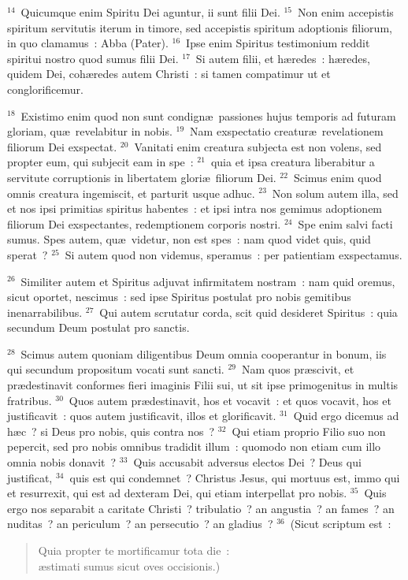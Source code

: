 ${}^{14}$~Quicumque enim Spiritu Dei aguntur, ii sunt filii Dei.
${}^{15}$~Non enim accepistis spiritum servitutis iterum in timore, sed accepistis spiritum adoptionis filiorum, in quo clamamus~: Abba (Pater).
${}^{16}$~Ipse enim Spiritus testimonium reddit spiritui nostro quod sumus filii Dei.
${}^{17}$~Si autem filii, et h\ae redes~: h\ae redes, quidem Dei, coh\ae redes autem Christi~: si tamen compatimur ut et conglorificemur.


${}^{18}$~Existimo enim quod non sunt condign\ae\ passiones hujus temporis ad futuram gloriam, qu\ae\ revelabitur in nobis.
${}^{19}$~Nam exspectatio creatur\ae\ revelationem filiorum Dei exspectat.
${}^{20}$~Vanitati enim creatura subjecta est non volens, sed propter eum, qui subjecit eam in spe~:
${}^{21}$~quia et ipsa creatura liberabitur a servitute corruptionis in libertatem glori\ae\ filiorum Dei.
${}^{22}$~Scimus enim quod omnis creatura ingemiscit, et parturit usque adhuc.
${}^{23}$~Non solum autem illa, sed et nos ipsi primitias spiritus habentes~: et ipsi intra nos gemimus adoptionem filiorum Dei exspectantes, redemptionem corporis nostri.
${}^{24}$~Spe enim salvi facti sumus. Spes autem, qu\ae\ videtur, non est spes~: nam quod videt quis, quid sperat~?
${}^{25}$~Si autem quod non videmus, speramus~: per patientiam exspectamus.


${}^{26}$~Similiter autem et Spiritus adjuvat infirmitatem nostram~: nam quid oremus, sicut oportet, nescimus~: sed ipse Spiritus postulat pro nobis gemitibus inenarrabilibus.
${}^{27}$~Qui autem scrutatur corda, scit quid desideret Spiritus~: quia secundum Deum postulat pro sanctis.


${}^{28}$~Scimus autem quoniam diligentibus Deum omnia cooperantur in bonum, iis qui secundum propositum vocati sunt sancti.
${}^{29}$~Nam quos pr\ae scivit, et pr\ae destinavit conformes fieri imaginis Filii sui, ut sit ipse primogenitus in multis fratribus.
${}^{30}$~Quos autem pr\ae destinavit, hos et vocavit~: et quos vocavit, hos et justificavit~: quos autem justificavit, illos et glorificavit.
${}^{31}$~Quid ergo dicemus ad h\ae c~? si Deus pro nobis, quis contra nos~?
${}^{32}$~Qui etiam proprio Filio suo non pepercit, sed pro nobis omnibus tradidit illum~: quomodo non etiam cum illo omnia nobis donavit~?
${}^{33}$~Quis accusabit adversus electos Dei~? Deus qui justificat,
${}^{34}$~quis est qui condemnet~? Christus Jesus, qui mortuus est, immo qui et resurrexit, qui est ad dexteram Dei, qui etiam interpellat pro nobis.
${}^{35}$~Quis ergo nos separabit a caritate Christi~? tribulatio~? an angustia~? an fames~? an nuditas~? an periculum~? an persecutio~? an gladius~?
${}^{36}$~(Sicut scriptum est~: \begin{flushleft}\begin{verse}Quia propter te mortificamur tota die~:\\ \ae stimati sumus sicut oves occisionis.)\end{verse}\end{flushleft}


